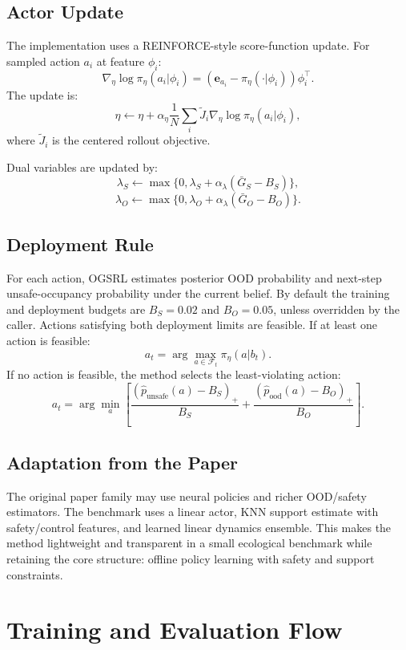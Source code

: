 \documentclass[11pt]{article}
\newcommand{\1}{\mathbf{1}}
\begin{document}
\subsection{Actor Update}

The implementation uses a REINFORCE-style score-function update.  For sampled
action $a_i$ at feature $\phi_i$:
\[
  \nabla_\eta\log\pi_\eta(a_i|\phi_i)
  =
  (\mathbf{e}_{a_i}-\pi_\eta(\cdot|\phi_i))\phi_i^\top.
\]
The update is:
\[
  \eta \leftarrow
  \eta+\alpha_\eta
  \frac{1}{N}\sum_i
  \tilde{J}_i
  \nabla_\eta\log\pi_\eta(a_i|\phi_i),
\]
where $\tilde{J}_i$ is the centered rollout objective.

Dual variables are updated by:
\[
  \lambda_S\leftarrow
  \max\{0,\lambda_S+\alpha_\lambda(\bar{G}_S-B_S)\},
\]
\[
  \lambda_O\leftarrow
  \max\{0,\lambda_O+\alpha_\lambda(\bar{G}_O-B_O)\}.
\]

\subsection{Deployment Rule}

For each action, OGSRL estimates posterior OOD probability and next-step
unsafe-occupancy probability under the current belief.  By default the training
and deployment budgets are $B_S=0.02$ and $B_O=0.05$, unless overridden by the
caller.  Actions satisfying both deployment limits are feasible.  If at least
one action is feasible:
\[
  a_t=\arg\max_{a\in\mathcal{F}_t}\pi_\eta(a|b_t).
\]
If no action is feasible, the method selects the least-violating action:
\[
  a_t=\arg\min_a
  \left[
    \frac{(\hat{p}_{\mathrm{unsafe}}(a)-B_S)_+}{B_S}
    +
    \frac{(\hat{p}_{\mathrm{ood}}(a)-B_O)_+}{B_O}
  \right].
\]

\subsection{Adaptation from the Paper}

The original paper family may use neural policies and richer OOD/safety
estimators.  The benchmark uses a linear actor, KNN support estimate with
safety/control features, and learned linear dynamics ensemble.  This makes the
method lightweight and transparent in a small ecological benchmark while
retaining the core structure: offline policy learning with safety and support
constraints.

\section{Training and Evaluation Flow}
\end{document}
